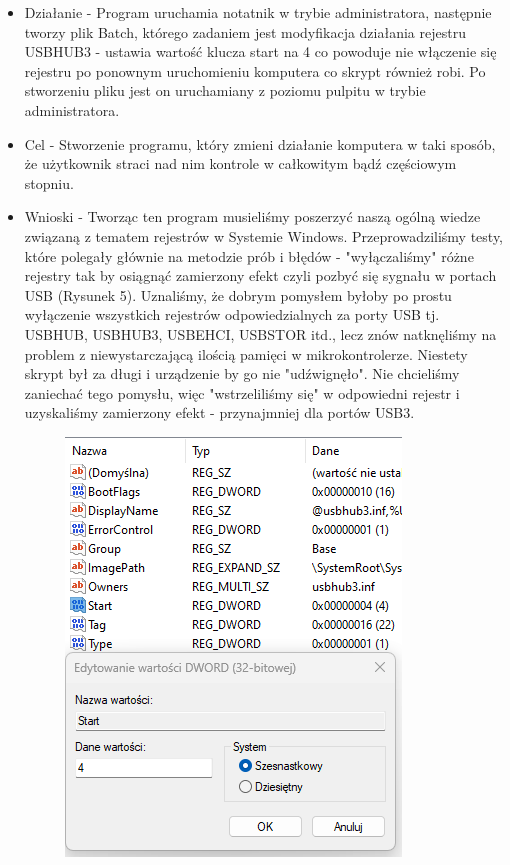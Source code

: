 \documentclass{article}
\begin{document}
    \begin{itemize}
        \item Działanie - Program uruchamia notatnik w trybie administratora, następnie tworzy plik Batch, którego zadaniem jest modyfikacja działania rejestru USBHUB3 - ustawia wartość klucza start na 4 co powoduje nie włączenie się rejestru po ponownym uruchomieniu komputera co skrypt również robi. Po stworzeniu pliku jest on uruchamiany z poziomu pulpitu w trybie administratora.
        \item Cel - Stworzenie programu, który zmieni działanie komputera w taki sposób, że użytkownik straci nad nim kontrole w całkowitym bądź częściowym stopniu.
        \item Wnioski - Tworząc ten program musieliśmy poszerzyć naszą ogólną wiedze związaną z tematem rejestrów w Systemie Windows. Przeprowadziliśmy testy, które polegały głównie na metodzie prób i błędów - "wyłączaliśmy" różne rejestry tak by osiągnąć zamierzony efekt czyli pozbyć się sygnału w portach USB (Rysunek 5). Uznaliśmy, że dobrym pomysłem byłoby po prostu wyłączenie wszystkich rejestrów odpowiedzialnych za porty USB tj. USBHUB, USBHUB3, USBEHCI, USBSTOR itd., lecz znów natknęliśmy na problem z niewystarczającą ilością pamięci w mikrokontrolerze. Niestety skrypt był za długi i urządzenie by go nie "udźwignęło". Nie chcieliśmy zaniechać tego pomysłu, więc "wstrzeliliśmy się" w odpowiedni rejestr i uzyskaliśmy zamierzony efekt - przynajmniej dla portów USB3.
        \begin{figure}[h]
    \centering
    \includegraphics[scale=0.4]{Media/Rejestr.png}

\end{figure}
\end{itemize}
\end{document}
